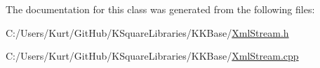The documentation for this class was generated from the following files\+:\begin{DoxyCompactItemize}
\item 
C\+:/\+Users/\+Kurt/\+Git\+Hub/\+K\+Square\+Libraries/\+K\+K\+Base/\hyperlink{_xml_stream_8h}{Xml\+Stream.\+h}\item 
C\+:/\+Users/\+Kurt/\+Git\+Hub/\+K\+Square\+Libraries/\+K\+K\+Base/\hyperlink{_xml_stream_8cpp}{Xml\+Stream.\+cpp}\end{DoxyCompactItemize}
